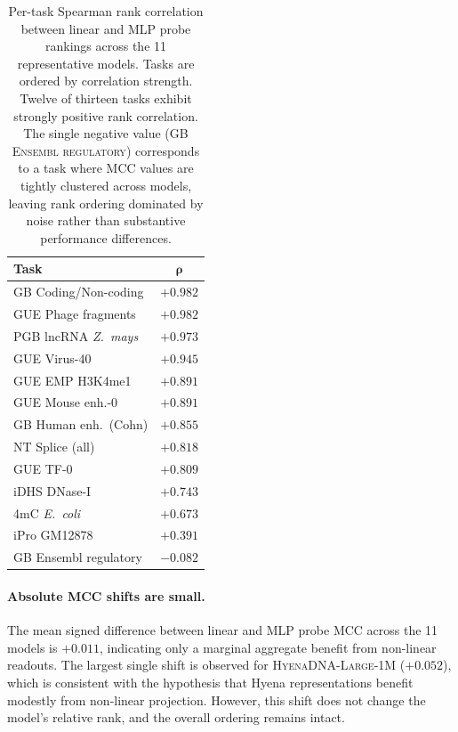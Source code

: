 \documentclass{llmxive}
\begin{document}
\begin{table}[!htbp]
\centering
\small
\begin{tabular}{@{}lc@{}}
\toprule
\textbf{Task} & $\boldsymbol{\rho}$ \\
\midrule
GB Coding/Non-coding        & $+0.982$ \\
GUE Phage fragments         & $+0.982$ \\
PGB lncRNA \emph{Z.\ mays}  & $+0.973$ \\
GUE Virus-40                & $+0.945$ \\
GUE EMP H3K4me1             & $+0.891$ \\
GUE Mouse enh.-0            & $+0.891$ \\
GB Human enh.\ (Cohn)       & $+0.855$ \\
NT Splice (all)             & $+0.818$ \\
GUE TF-0                    & $+0.809$ \\
iDHS DNase-I                & $+0.743$ \\
4mC \emph{E.\ coli}         & $+0.673$ \\
iPro GM12878                & $+0.391$ \\
GB Ensembl regulatory       & $-0.082$ \\
\bottomrule
\end{tabular}
\caption{Per-task Spearman rank correlation between linear and MLP probe
rankings across the 11 representative models. Tasks are ordered by
correlation strength. Twelve of thirteen tasks exhibit strongly positive
rank correlation. The single negative value
(\textsc{GB Ensembl regulatory}) corresponds to a task where MCC values
are tightly clustered across models, leaving rank ordering dominated by
noise rather than substantive performance differences.}
\label{tab:probe_per_task}
\end{table}

\paragraph{Absolute MCC shifts are small.}
The mean signed difference between linear and MLP probe MCC across the
11 models is $+0.011$, indicating only a marginal aggregate benefit from
non-linear readouts. The largest single shift is observed for
\textsc{HyenaDNA-Large-1M} ($+0.052$), which is consistent with the
hypothesis that Hyena representations benefit modestly from non-linear
projection. However, this shift does not change the model's relative
rank, and the overall ordering remains intact.
\end{document}
